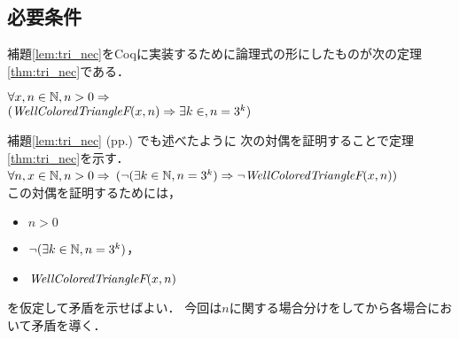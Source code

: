 
\subsection{必要条件} \label{sec:nec}
補題\ref{lem:tri_nec}をCoqに実装するために論理式の形にしたものが次の定理\ref{thm:tri_nec}である．
\begin{thm}[必要条件] \label{thm:tri_nec}
  $\forall x, n \in \mathbb{N}, n > 0 \Rightarrow$ \\
  $(\textit{WellColoredTriangleF}(x,n) \Rightarrow \exists k \in , n = 3^k)$ 
\end{thm}
補題\ref{lem:tri_nec} (pp.\pageref{lem:tri_nec}) でも述べたように
次の対偶を証明することで定理\ref{thm:tri_nec}を示す．\\
$\forall n, x \in \mathbb{N}, n > 0 \Rightarrow$
$(\lnot(\exists k \in \mathbb{N}, n = 3 ^ k) \Rightarrow \lnot\textit{WellColoredTriangleF}(x,n))$ \\
この対偶を証明するためには，
\begin{itemize}
\item
  $n > 0$
\item
  $\lnot(\exists k \in \mathbb{N}, n = 3 ^ k)$，
\item
  $\textit{WellColoredTriangleF}(x,n)$
\end{itemize}
を仮定して矛盾を示せばよい．
今回は$n$に関する場合分けをしてから各場合において矛盾を導く．
